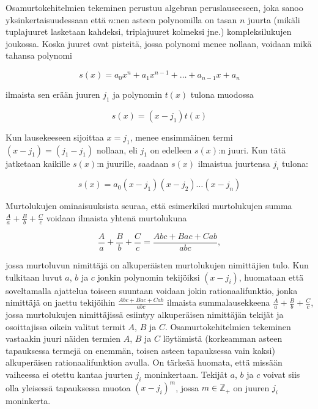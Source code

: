 \documentclass[../integrointiopas.tex]{subfiles}
\begin{document}
	Osamurtokehitelmien tekeminen perustuu algebran peruslauseeseen, joka sanoo yksinkertaisuudessaan että $n$:nen asteen polynomilla on tasan $n$ juurta (mikäli tuplajuuret lasketaan kahdeksi, triplajuuret kolmeksi jne.) kompleksilukujen joukossa. Koska juuret ovat pisteitä, jossa polynomi menee nollaan, voidaan mikä tahansa polynomi 
	
	\begin{equation}
		s(x) = a_0x^n + a_1x^{n-1}+\dots+a_{n-1}x + a_n
	\end{equation}
	
	 ilmaista sen erään juuren $j_1$ ja polynomin $t(x)$ tulona muodossa
	 
	 \begin{equation}
	 	s(x) = (x - j_1)t(x)
	 \end{equation}
 
 	Kun lausekeeseen sijoittaa $x = j_1$, menee ensimmäinen termi $(x - j_1) = (j_1 - j_1)$ nollaan, eli $j_1$ on edelleen $s(x)$:n juuri. Kun tätä jatketaan kaikille $s(x)$:n juurille, saadaan $s(x)$ ilmaistua juurtensa $j_i$ tulona: 
 	
 	\begin{equation}
 		s(x) = a_0(x - j_1)(x - j_2)\dots(x - j_n)
 	\end{equation}
	
	Murtolukujen ominaisuuksista seuraa, että esimerkiksi murtolukujen summa $\frac{A}{a} + \frac{B}{b} + \frac{C}{c}$ voidaan ilmaista yhtenä murtolukuna
	
	\begin{equation}
		\frac{A}{a} + \frac{B}{b} + \frac{C}{c} = \frac{Abc + Bac + Cab}{abc},
	\end{equation}

	jossa murtoluvun nimittäjä on alkuperäisten murtolukujen nimittäjien tulo. Kun tulkitaan luvut $a$, $b$ ja $c$ jonkin polynomin tekijöiksi $(x - j_i)$, huomataan että soveltamalla ajattelua toiseen suuntaan voidaan jokin rationaalifunktio, jonka nimittäjä on jaettu tekijöihin $\frac{Abc + Bac + Cab}{abc}$ ilmaista summalausekkeena $\frac{A}{a} + \frac{B}{b} + \frac{C}{c}$, jossa murtolukujen nimittäjissä esiintyy alkuperäisen nimittäjän tekijät ja osoittajissa oikein valitut termit $A$, $B$ ja $C$. Osamurtokehitelmien tekeminen vastaakin juuri näiden termien $A$, $B$ ja $C$ löytämistä (korkeamman asteen tapauksessa termejä on enemmän, toisen asteen tapauksessa vain kaksi) alkuperäisen rationaalifunktion avulla. On tärkeää huomata, että missään vaiheessa ei otettu kantaa juurten $j_i$ moninkertaan. Tekijät $a$, $b$ ja $c$ voivat siis olla yleisessä tapauksessa muotoa $(x - j_i)^m$, jossa $m\in\mathbb{Z}_+$ on juuren $j_i$ moninkerta. 
	
\end{document}
